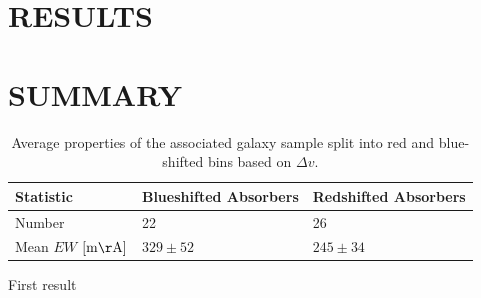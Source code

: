 \documentclass[iop]{emulateapj-rtx4}
\begin{document}
\section{RESULTS}






\section{SUMMARY}



\begin{table}[ht]\footnotesize
\begin{center}
\begin{tabular}{l l l}
 \hline \hline
 Statistic                				&  Blueshifted Absorbers   &     Redshifted Absorbers     \\ 
  \hline \hline
 Number 	          			 		&     	22				&	26			\\
 Mean $EW$    \scriptsize $\rm [m\AA]$    &	$329 \pm 52$ 		&	$245 \pm 34$  	\\
  
\hline
\end{tabular}
\end{center}
  \caption{\small{Average properties of the associated galaxy sample split into red and blue-shifted bins based on $\Delta v$.}}
  \label{resultsTable}
\end{table}


\vspace{10pt}

\indent \textbullet \indent First result
\end{document}
